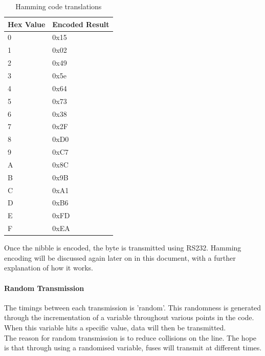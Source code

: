 \documentclass[draft,preprint,12pt,3p]{elsarticle}
\begin{document}
\begin{table}[H]
\centering
\resizebox{4cm}{!} {%
    \centering
    \begin{tabular}{| l | l |}
    \hline
    Hex Value & Encoded Result  \\ \hline
    0 & 0x15 \\ \hline
    1 & 0x02 \\ \hline
    2 & 0x49 \\ \hline
    3 & 0x5e \\ \hline
    4 & 0x64 \\ \hline
    5 & 0x73 \\ \hline
    6 & 0x38 \\ \hline
    7 & 0x2F \\ \hline
    8 & 0xD0 \\ \hline
    9 & 0xC7 \\ \hline
    A & 0x8C \\ \hline
    B & 0x9B \\ \hline
    C & 0xA1 \\ \hline
    D & 0xB6 \\ \hline
    E & 0xFD \\ \hline
    F & 0xEA \\ \hline
    \end{tabular}
}
\caption{Hamming code translations}
\end{table}
Once the nibble is encoded, the byte is transmitted using RS232. Hamming encoding will be discussed again later on in this document, with a further explanation of how it works.

\paragraph{Random Transmission}
The timings between each transmission is 'random'. This randomness is generated through the incrementation of a variable throughout various points in the code. When this variable hits a specific value, data will then be transmitted. \\
The reason for random transmission is to reduce collisions on the line. The hope is that through using a randomised variable, fuses will transmit at different times.
\end{document}
